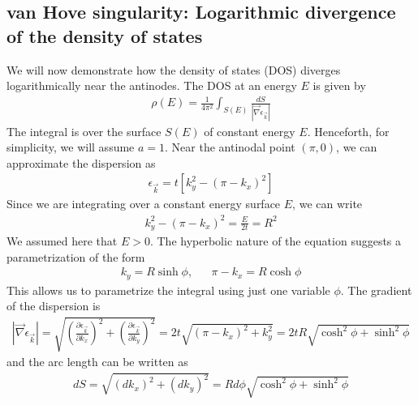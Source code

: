 \documentclass[12pt]{article}
\numberwithin{equation}{section}
\begin{document}
\newpage
\subsection*{van Hove singularity: Logarithmic divergence of the density of states}
We will now demonstrate how the density of states (DOS) diverges logarithmically near the antinodes. The DOS at an energy $E$ is given by
\begin{equation}\begin{aligned}
	\rho(E) = \frac{1}{4\pi^2}\int_{S(E)} \frac{dS}{|\vec \nabla \epsilon_{\vec{k}}|}
\end{aligned}\end{equation}
The integral is over the surface \(S(E)\) of constant energy $E$. Henceforth, for simplicity, we will assume \(a=1\). Near the antinodal point \(\left(\pi, 0\right) \), we can approximate the dispersion as
\begin{equation}\begin{aligned}
	\epsilon_{\vec k} = t\left[k_y^2 - \left( \pi - k_x \right) ^2\right] 
\end{aligned}\end{equation}
Since we are integrating over a constant energy surface \(E \), we can write
\begin{equation}\begin{aligned}
	k_y^2 - \left( \pi - k_x \right)^2 = \frac{E}{2t} = R^2
\end{aligned}\end{equation}
We assumed here that \(E > 0\). The hyperbolic nature of the equation suggests a parametrization of the form
\begin{equation}\begin{aligned}
	k_y = R\sinh \phi, &&\pi - k_x = R\cosh \phi
\end{aligned}\end{equation}
This allows us to parametrize the integral using just one variable \(\phi\). The gradient of the dispersion is
\begin{equation}\begin{aligned}
	|\vec \nabla \epsilon_{\vec{k}}| = \sqrt{\left(\frac{\partial{\epsilon_{\vec k}}}{\partial{k_x}}\right)^2 + \left(\frac{\partial{\epsilon_{\vec k}}}{\partial{k_y}}\right)^2} = 2t\sqrt{\left(\pi - k_x\right)^2 + k_y^2} = 2tR\sqrt{\cosh^2\phi + \sinh^2\phi}
\end{aligned}\end{equation}
and the arc length can be written as
\begin{equation}\begin{aligned}
	dS = \sqrt{(dk_x)^2 + (dk_y)^2} = Rd\phi\sqrt{\cosh^2\phi + \sinh^2\phi}
\end{aligned}\end{equation}
\end{document}
